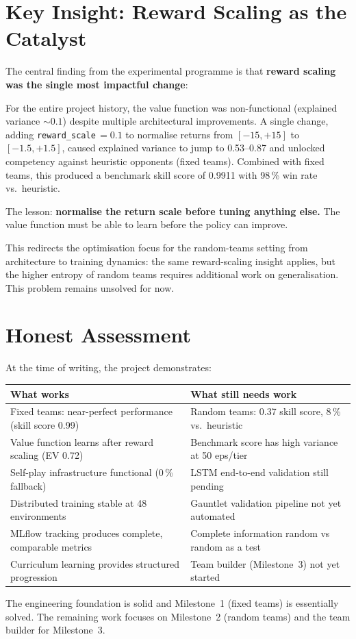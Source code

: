 \section{Key Insight: Reward Scaling as the Catalyst}

The central finding from the experimental programme is that \textbf{reward
scaling was the single most impactful change}:

\begin{keyinsight}
For the entire project history, the value function was non-functional
(explained variance ${\sim}0.1$) despite multiple architectural improvements.
A single change, adding \texttt{reward\_scale}$\,=0.1$ to normalise returns
from $[-15,+15]$ to $[-1.5,+1.5]$, caused explained variance to jump to
0.53--0.87 and unlocked competency against heuristic opponents (fixed teams).  Combined with
fixed teams, this produced a benchmark skill score of 0.9911 with 98\,\% win
rate vs.\ heuristic.

The lesson: \textbf{normalise the return scale before tuning anything else.}
The value function must be able to learn before the policy can improve.
\end{keyinsight}

This redirects the optimisation focus for the random-teams setting from
architecture to training dynamics: the same reward-scaling insight applies,
but the higher entropy of random teams requires additional work on
generalisation. This problem remains unsolved for now.

\section{Honest Assessment}

At the time of writing, the project demonstrates:

\begin{center}
\small
\begin{tabularx}{\textwidth}{l X}
  \toprule
  \textbf{What works} & \textbf{What still needs work} \\
  \midrule
  Fixed teams: near-perfect performance (skill score 0.99) &
    Random teams: 0.37 skill score, 8\,\% vs.\ heuristic \\
  Value function learns after reward scaling (EV 0.72) &
    Benchmark score has high variance at 50 eps/tier \\
  Self-play infrastructure functional (0\,\% fallback) &
    LSTM end-to-end validation still pending \\
  Distributed training stable at 48 environments &
    Gauntlet validation pipeline not yet automated \\
  MLflow tracking produces complete, comparable metrics &
    Complete information random vs random as a test \\
  Curriculum learning provides structured progression &
    Team builder (Milestone~3) not yet started \\
  \bottomrule
\end{tabularx}
\end{center}

The engineering foundation is solid and Milestone~1 (fixed teams) is
essentially solved.  The remaining work focuses on Milestone~2 (random teams)
and the team builder for Milestone~3.
